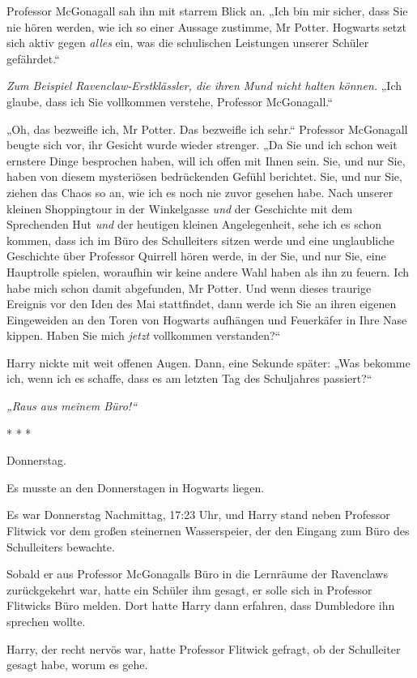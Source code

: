 {Professor McGonagall sah ihn mit starrem Blick an. „Ich bin mir sicher, dass Sie nie hören werden, wie ich so einer Aussage zustimme, Mr Potter. Hogwarts setzt sich aktiv gegen \emph{alles} ein, was die schulischen Leistungen unserer Schüler gefährdet.“

\emph{Zum Beispiel Ravenclaw-Erstklässler, die ihren Mund nicht halten können.} „Ich glaube, dass ich Sie vollkommen verstehe, Professor McGonagall.“

„Oh, das bezweifle ich, Mr Potter. Das bezweifle ich sehr.“ Professor McGonagall beugte sich vor, ihr Gesicht wurde wieder strenger. „Da Sie und ich schon weit ernstere Dinge besprochen haben, will ich offen mit Ihnen sein. Sie, und nur Sie, haben von diesem mysteriösen bedrückenden Gefühl berichtet. Sie, und nur Sie, ziehen das Chaos so an, wie ich es noch nie zuvor gesehen habe. Nach unserer kleinen Shoppingtour in der Winkelgasse \emph{und} der Geschichte mit dem Sprechenden Hut \emph{und} der heutigen kleinen Angelegenheit, sehe ich es schon kommen, dass ich im Büro des Schulleiters sitzen werde und eine unglaubliche Geschichte über Professor Quirrell hören werde, in der Sie, und nur Sie, eine Hauptrolle spielen, woraufhin wir keine andere Wahl haben als ihn zu feuern. Ich habe mich schon damit abgefunden, Mr Potter. Und wenn dieses traurige Ereignis vor den Iden des Mai stattfindet, dann werde ich Sie an ihren eigenen Eingeweiden an den Toren von Hogwarts aufhängen und Feuerkäfer in Ihre Nase kippen. Haben Sie mich \emph{jetzt} vollkommen verstanden?“

Harry nickte mit weit offenen Augen. Dann, eine Sekunde später: „Was bekomme ich, wenn ich es schaffe, dass es am letzten Tag des Schuljahres passiert?“

\emph{„Raus aus meinem Büro!“}

* * *

Donnerstag.

Es musste an den Donnerstagen in Hogwarts liegen.

Es war Donnerstag Nachmittag, 17:23 Uhr, und Harry stand neben Professor Flitwick vor dem großen steinernen Wasserspeier, der den Eingang zum Büro des Schulleiters bewachte.

Sobald er aus Professor McGonagalls Büro in die Lernräume der Ravenclaws zurückgekehrt war, hatte ein Schüler ihm gesagt, er solle sich in Professor Flitwicks Büro melden. Dort hatte Harry dann erfahren, dass Dumbledore ihn sprechen wollte.

Harry, der recht nervös war, hatte Professor Flitwick gefragt, ob der Schulleiter gesagt habe, worum es gehe.

}
